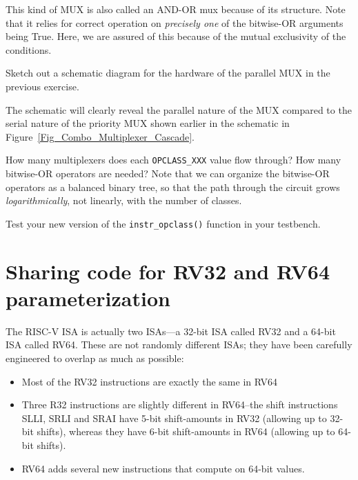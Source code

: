   This kind of MUX is also called an AND-OR mux because of its
  structure.  Note that it relies for correct operation on
  \emph{precisely one} of the bitwise-OR arguments being True.  Here,
  we are assured of this because of the mutual exclusivity of the
  conditions.

\Exercise

Sketch out a schematic diagram for the hardware of the parallel MUX in
the previous exercise.

The schematic will clearly reveal the parallel nature of the MUX
compared to the serial nature of the priority MUX shown earlier in the
schematic in Figure~\ref{Fig_Combo_Multiplexer_Cascade}.

How many multiplexers does each \verb|OPCLASS_XXX| value flow through?
How many bitwise-OR operators are needed?  Note that we can organize
the bitwise-OR operators as a balanced binary tree, so that the path
through the circuit grows \emph{logarithmically}, not linearly, with
the number of classes.

\Exercise

Test your new version of the \verb|instr_opclass()| function in your
testbench.

\Endexercise


\section{Sharing code for RV32 and RV64 {\via} parameterization}

\label{BSV_Paramterizing_XLEN}


The RISC-V ISA is actually two ISAs---a 32-bit ISA called RV32 and a
64-bit ISA called RV64.  These are not randomly different ISAs; they
have been carefully engineered to overlap as much as possible:

\begin{itemize}

\item Most of the RV32 instructions are exactly the same in RV64

\item Three R32 instructions are slightly different in RV64--the shift
instructions SLLI, SRLI and SRAI have 5-bit shift-amounts in RV32
(allowing up to 32-bit shifts), whereas they have 6-bit shift-amounts
in RV64 (allowing up to 64-bit shifts).

\item RV64 adds several new instructions that compute on 64-bit values.

\end{itemize}

